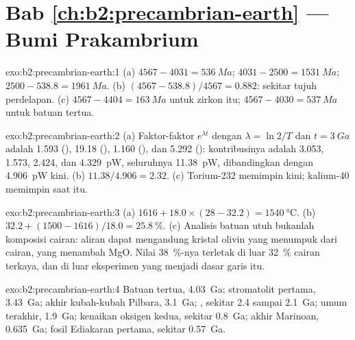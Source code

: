 \section*{Bab \ref{ch:b2:precambrian-earth} --- Bumi Prakambrium}

\begin{solution}{exo:b2:precambrian-earth:1}
(a)  $4567 - 4031 = \qty{536}{Ma}$;  $4031 - 2500 = \qty{1531}{Ma}$;
 $2500 - 538.8 = \qty{1961}{Ma}$. (b) $(4567 - 538.8)/4567 = 0.882$: sekitar tujuh
perdelapan. (c) $4567 - 4404 = \qty{163}{Ma}$ untuk zirkon itu; $4567 - 4030 = \qty{537}{Ma}$ untuk
batuan tertua.
\end{solution}

\begin{solution}{exo:b2:precambrian-earth:2}
(a) Faktor-faktor $e^{\lambda t}$ dengan $\lambda = \ln2/T$ dan $t = \qty{3}{Ga}$ adalah 1.593
(), 19.18 (), 1.160 (), dan 5.292 (): kontribusinya
adalah 3.053, 1.573, 2.424, dan \qty{4.329}{pW}, seluruhnya \qty{11.38}{pW}, dibandingkan dengan
\qty{4.906}{pW} kini. (b) $11.38/4.906 = 2.32$. (c) Torium-232 memimpin kini; kalium-40 memimpin
saat itu.
\end{solution}

\begin{solution}{exo:b2:precambrian-earth:3}
(a) $1616 + 18.0\times(28 - 32.2) = \qty{1540}{\celsius}$. (b) $32.2 + (1500 - 1616)/18.0 =
\qty{25.8}{\percent}$. (c) Analisis batuan utuh bukanlah komposisi cairan: aliran
 dapat mengandung kristal olivin yang menumpuk dari cairan, yang menambah MgO. Nilai
\qty{38}{\percent}-nya terletak di luar \qty{32}{\percent} cairan  terkaya, dan
di luar eksperimen yang menjadi dasar garis itu.
\end{solution}

\begin{solution}{exo:b2:precambrian-earth:4}
Batuan tertua, \qty{4.03}{Ga}; stromatolit pertama, \qty{3.43}{Ga}; akhir kubah-kubah Pilbara,
\qty{3.1}{Ga}; , sekitar 2.4 sampai \qty{2.1}{Ga};  umum terakhir,
\qty{1.9}{Ga}; kenaikan oksigen kedua, sekitar \qty{0.8}{Ga}; akhir Marinoan,
\qty{0.635}{Ga}; fosil Ediakaran pertama, sekitar \qty{0.57}{Ga}.
\end{solution}

